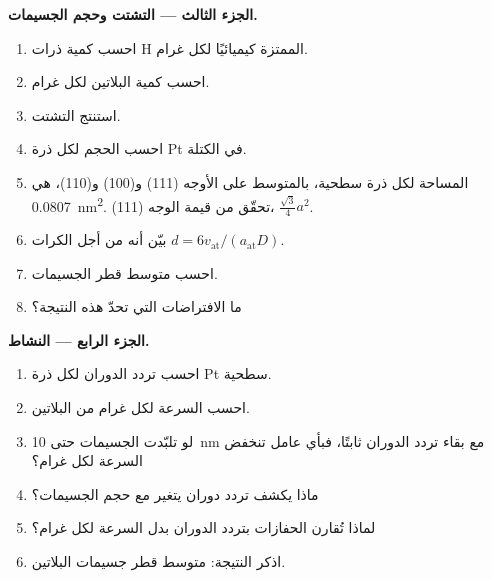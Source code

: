 \begin{problem}
\medskip\noindent\textbf{الجزء الثالث --- التشتت وحجم الجسيمات.}
\begin{enumerate}[resume]
  \item احسب كمية ذرات H الممتزة كيميائيًا لكل غرام.
  \item احسب كمية البلاتين لكل غرام.
  \item استنتج التشتت.
  \item احسب الحجم لكل ذرة Pt في الكتلة.
  \item المساحة لكل ذرة سطحية، بالمتوسط على الأوجه (111) و(100) و(110)،
        هي \qty{0.0807}{nm^2}. تحقّق من قيمة الوجه (111)، $\frac{\sqrt3}{4}a^2$.
  \item بيّن أنه من أجل الكرات $d = 6v_{\mathrm{at}}/(a_{\mathrm{at}}D)$.
  \item احسب متوسط قطر الجسيمات.
  \item ما الافتراضات التي تحدّ هذه النتيجة؟
\end{enumerate}

\medskip\noindent\textbf{الجزء الرابع --- النشاط.}
\begin{enumerate}[resume]
  \item احسب تردد الدوران لكل ذرة Pt سطحية.
  \item احسب السرعة لكل غرام من البلاتين.
  \item لو تلبّدت الجسيمات حتى \qty{10}{nm} مع بقاء تردد الدوران ثابتًا، فبأي
        عامل تنخفض السرعة لكل غرام؟
  \item ماذا يكشف تردد دوران يتغير مع حجم الجسيمات؟
  \item لماذا تُقارن الحفازات بتردد الدوران بدل السرعة لكل
        غرام؟
  \item اذكر النتيجة: متوسط قطر جسيمات البلاتين.
\end{enumerate}
\end{problem}
